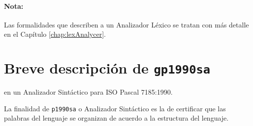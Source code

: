 \paragraph*{Nota:} Las formalidades que describen a un Analizador Léxico se
tratan con más detalle en el Capítulo \ref{chap:lexAnalycer}.

\section{Breve descripción de {\tt gp1990sa}}

 {} en un Analizador Sintáctico para ISO Pascal 
7185:1990.

% 
% 
% 
% 
% 
% 
% 


 La finalidad de {\tt p1990sa} o Analizador Sintáctico es la de certificar que las
palabras del lenguaje se organizan de acuerdo a la estructura del lenguaje.

% 
% 
% 
% 
% 

